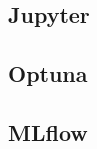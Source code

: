 \documentclass[../../main.tex]{subfiles}
\begin{document}
\subsection{Jupyter}

\subsection{Optuna}

\subsection{MLflow}
\end{document}
